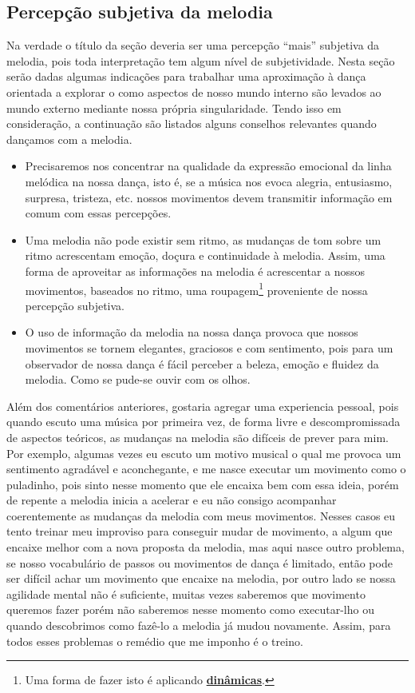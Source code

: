 \subsection{Percepção subjetiva da melodia} 
Na verdade o título da seção deveria ser uma percepção ``mais'' subjetiva da melodia,
pois toda interpretação tem algum nível de subjetividade. 
Nesta seção serão dadas algumas indicações para trabalhar uma aproximação à dança 
orientada a explorar o como aspectos de nosso mundo interno
são levados ao mundo externo mediante nossa própria singularidade.
Tendo isso em consideração, a continuação são listados alguns conselhos relevantes quando dançamos com a melodia.
\begin{itemize}
\item Precisaremos nos concentrar na qualidade da expressão emocional da linha melódica na nossa dança,
isto é, se a música nos evoca alegria, entusiasmo, surpresa, tristeza, etc. nossos movimentos
devem transmitir informação em comum com essas percepções.

\item Uma melodia não pode existir sem ritmo, 
as mudanças de tom sobre um ritmo acrescentam emoção, doçura e continuidade à melodia.
Assim, uma forma de aproveitar as informações na melodia é acrescentar a nossos movimentos, 
baseados no ritmo,
uma roupagem\footnote{Uma forma de fazer isto é aplicando \hyperref[sec:musicalidade:dinamicas]{\textbf{dinâmicas}}.} proveniente de nossa percepção subjetiva.


\item O uso de informação da melodia na nossa dança provoca que nossos movimentos se tornem elegantes, 
graciosos e com sentimento, pois para um observador de nossa dança é fácil perceber a beleza, emoção e fluidez da melodia.
Como se pude-se ouvir com os olhos.
\end{itemize}

Além dos comentários anteriores, gostaria agregar uma experiencia pessoal,
pois quando escuto uma música por primeira vez, 
de forma livre e descompromissada de aspectos teóricos, 
as mudanças na melodia  são difíceis de prever para mim.
Por exemplo, algumas vezes eu escuto um motivo musical o qual me provoca um sentimento agradável e aconchegante,
e me nasce executar um movimento como o puladinho, pois sinto nesse momento que ele encaixa bem com essa ideia,
porém de repente a melodia inicia a acelerar e eu não consigo acompanhar coerentemente 
as mudanças da melodia com meus movimentos.
Nesses casos eu tento treinar meu improviso para conseguir mudar de movimento, a algum que encaixe melhor com a nova 
proposta da melodia, mas aqui nasce outro problema, 
se nosso vocabulário de passos ou movimentos de dança é limitado, 
então pode ser difícil achar um movimento que encaixe na melodia,
por outro lado se nossa agilidade mental não é suficiente,
muitas vezes saberemos que movimento queremos fazer porém 
não saberemos nesse momento como executar-lho ou quando descobrimos como fazê-lo a melodia já mudou novamente.
Assim, para todos esses problemas o remédio que me imponho é o treino.



